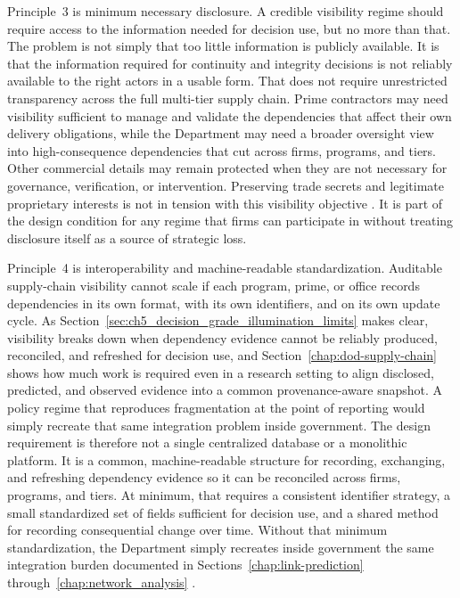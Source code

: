 Principle~3 is minimum necessary disclosure. A credible visibility regime should require access to the information needed for decision use, but no more than that. The problem is not simply that too little information is publicly available. It is that the information required for continuity and integrity decisions is not reliably available to the right actors in a usable form. That does not require unrestricted transparency across the full multi-tier supply chain. Prime contractors may need visibility sufficient to manage and validate the dependencies that affect their own delivery obligations, while the Department may need a broader oversight view into high-consequence dependencies that cut across firms, programs, and tiers. Other commercial details may remain protected when they are not necessary for governance, verification, or intervention. Preserving trade secrets and legitimate proprietary interests is not in tension with this visibility objective \parencite{ch5_nist800161r1upd1,ch5_dodi520044}. It is part of the design condition for any regime that firms can participate in without treating disclosure itself as a source of strategic loss.

Principle~4 is interoperability and machine-readable standardization. Auditable supply-chain visibility cannot scale if each program, prime, or office records dependencies in its own format, with its own identifiers, and on its own update cycle. As Section~\ref{sec:ch5_decision_grade_illumination_limits} makes clear, visibility breaks down when dependency evidence cannot be reliably produced, reconciled, and refreshed for decision use, and Section~\ref{chap:dod-supply-chain} shows how much work is required even in a research setting to align disclosed, predicted, and observed evidence into a common provenance-aware snapshot. A policy regime that reproduces fragmentation at the point of reporting would simply recreate that same integration problem inside government. The design requirement is therefore not a single centralized database or a monolithic platform. It is a common, machine-readable structure for recording, exchanging, and refreshing dependency evidence so it can be reconciled across firms, programs, and tiers. At minimum, that requires a consistent identifier strategy, a small standardized set of fields sufficient for decision use, and a shared method for recording consequential change over time. Without that minimum standardization, the Department simply recreates inside government the same integration burden documented in Sections~\ref{chap:link-prediction} through~\ref{chap:network_analysis} \parencite{ch5_nist800161r1upd1}.

